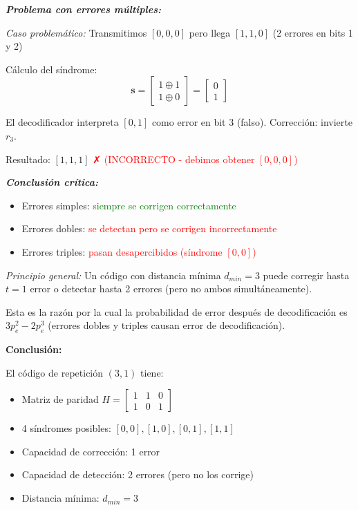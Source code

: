 \documentclass[11pt,a4paper]{article}
\begin{document}
\textit{\textbf{Problema con errores m\'ultiples:}}

\textit{Caso problem\'atico:} Transmitimos $[0,0,0]$ pero llega $[1,1,0]$ (2 errores en bits 1 y 2)

C\'alculo del s\'indrome:
\[
\mathbf{s} = \begin{bmatrix}
1 \oplus 1 \\
1 \oplus 0
\end{bmatrix} = \begin{bmatrix}
0 \\
1
\end{bmatrix}
\]

El decodificador interpreta $[0,1]$ como error en bit 3 (falso). Correcci\'on: invierte $r_3$.

Resultado: $[1,1,1]$ \textcolor{red}{✗ (INCORRECTO - debimos obtener $[0,0,0]$)}

\vspace{0.2cm}

\textit{\textbf{Conclusi\'on cr\'itica:}}
\begin{itemize}
    \item Errores simples: \textcolor{green}{siempre se corrigen correctamente}
    \item Errores dobles: \textcolor{red}{se detectan pero se corrigen incorrectamente}
    \item Errores triples: \textcolor{red}{pasan desapercibidos (s\'indrome $[0,0]$)}
\end{itemize}

\textit{Principio general:} Un c\'odigo con distancia m\'inima $d_{min} = 3$ puede corregir hasta $t = 1$ error o detectar hasta 2 errores (pero no ambos simult\'aneamente).

Esta es la raz\'on por la cual la probabilidad de error despu\'es de decodificaci\'on es $3p_e^2 - 2p_e^3$ (errores dobles y triples causan error de decodificaci\'on).

\textbf{Conclusi\'on:}

El c\'odigo de repetici\'on $(3,1)$ tiene:
\begin{itemize}
    \item Matriz de paridad $H = \begin{bmatrix} 1 & 1 & 0 \\ 1 & 0 & 1 \end{bmatrix}$
    \item 4 s\'indromes posibles: $[0,0], [1,0], [0,1], [1,1]$
    \item Capacidad de correcci\'on: 1 error
    \item Capacidad de detecci\'on: 2 errores (pero no los corrige)
    \item Distancia m\'inima: $d_{min} = 3$
\end{itemize}
\end{document}
